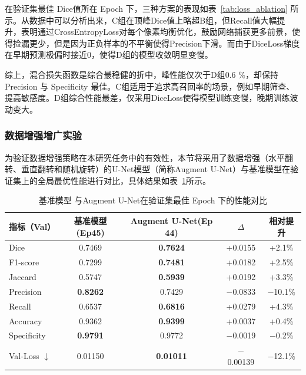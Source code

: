 在验证集最佳 Dice值所在 Epoch 下，三种方案的表现如表~\ref{tab:loss_ablation} 所示。从数据中可以分析出来，C组在顶峰Dice值上略超B组，但Recall值大幅提升，表明通过CrossEntropyLoss对每个像素均衡优化，鼓励网络捕获更多前景，使得捡漏更少，但是因为正负样本的不平衡使得Precision下滑。而由于DiceLoss梯度在早期预测极偏时接近0，使得D组的模型收敛明显变慢。

综上，混合损失函数是综合最稳健的折中，峰性能仅次于D组0.6 \%，却保持 Precision 与 Specificity 最佳。C组适用于追求高召回率的场景，例如早期筛查、提高敏感度。D组综合性能最差，仅采用DiceLoss使得模型训练变慢，晚期训练波动变大。

\subsubsection{数据增强增广实验}

为验证数据增强策略在本研究任务中的有效性，本节将采用了数据增强（水平翻转、垂直翻转和随机旋转）的U-Net模型（简称Augment U-Net）与基准模型在验证集上的全局最优性能进行对比，具体结果如表~\ref{tab:augment_best}所示。

\begin{table}[htbp]
    \centering
    \caption{基准模型 与Augment U-Net在验证集最佳 Epoch 下的性能对比}
    \label{tab:augment_best}
    \begin{tabular}{lcccc}
        \toprule
        指标（Val） & 基准模型(Ep45) & Augment U-Net(Ep 44) & $\Delta$ & 相对提升 \\
        \midrule
        Dice        & 0.7469 & \textbf{0.7624} & +0.0155 & +2.1\% \\
        F1-score    & 0.7299 & \textbf{0.7481} & +0.0182 & +2.5\% \\
        Jaccard     & 0.5747 & \textbf{0.5939} & +0.0192 & +3.3\% \\
        Precision   & \textbf{0.8262} & 0.7429 & $-$0.0833 & $-$10.1\% \\
        Recall      & 0.6537 & \textbf{0.6816} & +0.0279 & +4.3\% \\
        Accuracy    & 0.9362 & \textbf{0.9399} & +0.0037 & +0.4\% \\
        Specificity & \textbf{0.9791} & 0.9772 & $-$0.0019 & $-$0.2\% \\
        Val-Loss $\downarrow$ & 0.01150 & \textbf{0.01011} & $-$0.00139 & $-$12.1\% \\
        \bottomrule
    \end{tabular}
\end{table}

